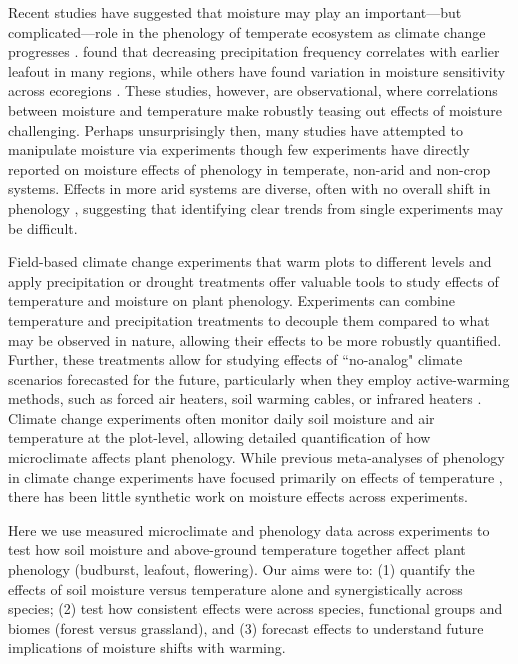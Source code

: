 \documentclass{article}
\begin{document}
\par Recent studies have suggested that moisture may play an important---but complicated---role in the phenology of temperate ecosystem as climate change progresses \citep[e.g.,][]{seyed2018,wang2022}. \citet{wang2022} found that decreasing precipitation frequency correlates with earlier leafout in many regions, while others have found variation in moisture sensitivity across ecoregions \citep{seyed2018}. These studies, however, are observational, where correlations between moisture and temperature make robustly teasing out effects of moisture challenging. Perhaps unsurprisingly then, many studies have attempted to manipulate moisture via experiments \citep[e.g.,][]{morin2010,hoeppner2012,rollinson2012b,clark2014a} though few experiments have directly reported on moisture effects of phenology in temperate, non-arid and non-crop systems. Effects in more arid systems are diverse, often with no overall shift in phenology \citep[e.g.,][]{sherry2007,de2017challenging,howell2020}, suggesting that identifying clear trends from single experiments may be difficult. 

\par Field-based climate change experiments that warm plots to different levels and apply precipitation or drought treatments offer valuable tools to study effects of temperature and moisture on plant phenology. Experiments can combine temperature and precipitation treatments to decouple them compared to what may be observed in nature, allowing their effects to be more robustly quantified. Further, these treatments allow for studying effects of ``no-analog" climate scenarios forecasted for the future, particularly when they employ active-warming methods, such as forced air heaters, soil warming cables, or infrared heaters \citep{shaver2000,williams2007b,aronson2009}. Climate change experiments often monitor daily soil moisture and air temperature at the plot-level, allowing detailed quantification of how microclimate affects plant phenology. While previous meta-analyses of phenology in climate change experiments have focused primarily on effects of temperature \citep[e.g.,][]{wolkovich2012}, there has been little synthetic work on moisture effects across experiments. 
\par Here we use measured microclimate and phenology data across experiments to test how soil moisture and above-ground temperature together affect plant phenology (budburst, leafout, flowering). Our aims were to: (1) quantify the effects of soil moisture versus temperature alone and synergistically across species; (2) test how consistent effects were across species, functional groups and biomes (forest versus grassland), and (3) forecast effects to understand future implications of moisture shifts with warming. 
\end{document}
